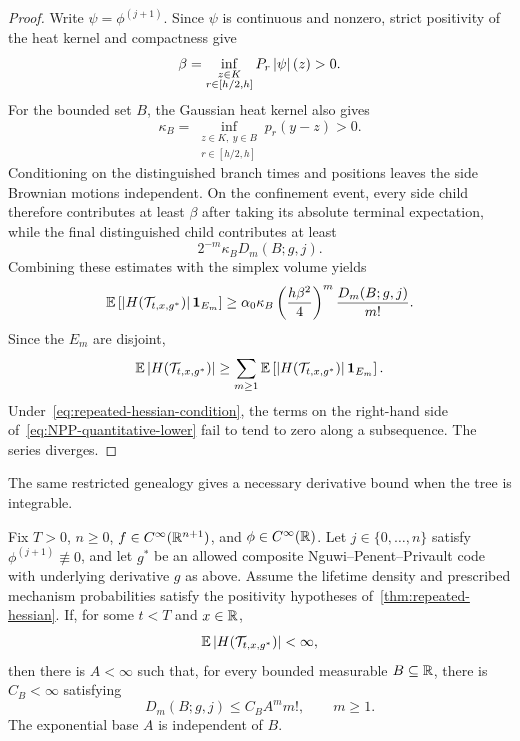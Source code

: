 \begin{proof}
Write $\psi=\phi^{(j+1)}$. Since $\psi$ is continuous and nonzero, strict positivity of the heat kernel and compactness give
\begin{equation*}
  \beta
  =
  \inf_{\substack{z\in K\\r\in[h/2,h]}}
  P_r\left|\psi\right|(z)
  >0.
\end{equation*}
For the bounded set $B$, the Gaussian heat kernel also gives
\begin{equation*}
  \kappa_B
  =
  \inf_{\substack{z\in K,\ y\in B\\r\in[h/2,h]}}
  p_r(y-z)
  >0.
\end{equation*}
Conditioning on the distinguished branch times and positions leaves the side Brownian motions independent. On the confinement event, every side child therefore contributes at least $\beta$ after taking its absolute terminal expectation, while the final distinguished child contributes at least
\begin{equation*}
  2^{-m}\kappa_BD_m(B;g,j).
\end{equation*}
Combining these estimates with the simplex volume yields
\begin{equation}
  \mathbb E\left[
    \left|H(\mathcal T_{t,x,g^*})\right|\mathbf 1_{E_m}
  \right]
  \geq
  \alpha_0\kappa_B
  \left(\frac{h\beta^2}{4}\right)^m
  \frac{D_m(B;g,j)}{m!}.
  \label{eq:NPP-quantitative-lower}
\end{equation}
Since the $E_m$ are disjoint,
\begin{equation*}
  \mathbb E\left|H(\mathcal T_{t,x,g^*})\right|
  \geq
  \sum_{m\geq1}
  \mathbb E\left[
    \left|H(\mathcal T_{t,x,g^*})\right|\mathbf 1_{E_m}
  \right].
\end{equation*}
Under~\eqref{eq:repeated-hessian-condition}, the terms on the right-hand side of~\eqref{eq:NPP-quantitative-lower} fail to tend to zero along a subsequence. The series diverges.
\end{proof}

The same restricted genealogy gives a necessary derivative bound when the tree is integrable.

\begin{proposition}
\label{prop:integrated-derivative-bound}
Fix $T>0$, $n\geq0$, $f\in C^\infty(\mathbb R^{n+1})$, and $\phi\in C^\infty(\mathbb R)$. Let $j\in\{0,\ldots,n\}$ satisfy $\phi^{(j+1)}\not\equiv0$, and let $g^*$ be an allowed composite Nguwi--Penent--Privault code with underlying derivative $g$ as above. Assume the lifetime density and prescribed mechanism probabilities satisfy the positivity hypotheses of~\cref{thm:repeated-hessian}. If, for some $t<T$ and $x\in\mathbb R$,
\begin{equation*}
  \mathbb E\left|H(\mathcal T_{t,x,g^*})\right|<\infty,
\end{equation*}
then there is $A<\infty$ such that, for every bounded measurable $B\subseteq\mathbb R$, there is $C_B<\infty$ satisfying
\begin{equation}
  D_m(B;g,j)
  \leq
  C_BA^m m!,
  \qquad m\geq1.
  \label{eq:integrated-derivative-bound}
\end{equation}
The exponential base $A$ is independent of $B$.
\end{proposition}

